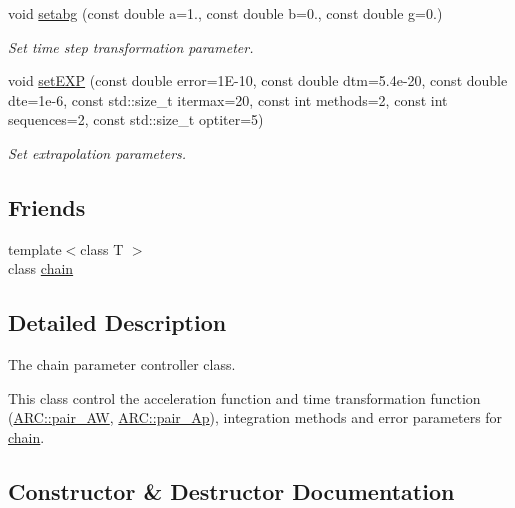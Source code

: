 \begin{DoxyCompactItemize}
void \hyperlink{classARC_1_1chainpars_a37f8af288217cbfc61a3593e21976d06}{setabg} (const double a=1., const double b=0., const double g=0.)
\begin{DoxyCompactList}\small\item\em Set time step transformation parameter. \end{DoxyCompactList}\item 
void \hyperlink{classARC_1_1chainpars_a5ead29e9b2005ba1933821deb96a5876}{set\+E\+XP} (const double error=1\+E-\/10, const double dtm=5.\+4e-\/20, const double dte=1e-\/6, const std\+::size\+\_\+t itermax=20, const int methods=2, const int sequences=2, const std\+::size\+\_\+t optiter=5)
\begin{DoxyCompactList}\small\item\em Set extrapolation parameters. \end{DoxyCompactList}\end{DoxyCompactItemize}
\subsection*{Friends}
\begin{DoxyCompactItemize}
\item 
{\footnotesize template$<$class T $>$ }\\class \hyperlink{classARC_1_1chainpars_a498fbb4337b9878a5f0044996e4a2489}{chain}
\end{DoxyCompactItemize}


\subsection{Detailed Description}
The chain parameter controller class. 

This class control the acceleration function and time transformation function (\hyperlink{namespaceARC_a5c4308ca4a8d0e0ff59fdce30f00274c}{A\+R\+C\+::pair\+\_\+\+AW}, \hyperlink{namespaceARC_a819446c4644b3a3af7ef11574d0b55e0}{A\+R\+C\+::pair\+\_\+\+Ap}), integration methods and error parameters for \hyperlink{classARC_1_1chain}{chain}. 

\subsection{Constructor \& Destructor Documentation}
\hypertarget{classARC_1_1chainpars_a2019a609d85e2b801f306ac8c7f268ab}{}\label{classARC_1_1chainpars_a2019a609d85e2b801f306ac8c7f268ab} 
